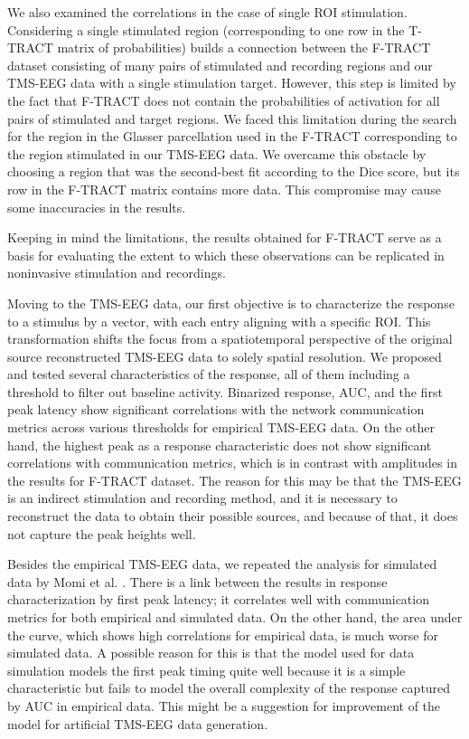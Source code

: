 We also examined the correlations in the case of single ROI stimulation. Considering a single stimulated region (corresponding to one row in the T-TRACT matrix of probabilities) builds a connection between the F-TRACT dataset consisting of many pairs of stimulated and recording regions and our TMS-EEG data with a single stimulation target. However, this step is limited by the fact that F-TRACT does not contain the probabilities of activation for all pairs of stimulated and target regions. We faced this limitation during the search for the region in the Glasser parcellation used in the F-TRACT corresponding to the region stimulated in our TMS-EEG data. We overcame this obstacle by choosing a region that was the second-best fit according to the Dice score, but its row in the F-TRACT matrix contains more data. This compromise may cause some inaccuracies in the results.

Keeping in mind the limitations, the results obtained for F-TRACT serve as a basis for evaluating the extent to which these observations can be replicated in noninvasive stimulation and recordings. 

Moving to the TMS-EEG data, our first objective is to characterize the response to a stimulus by a vector, with each entry aligning with a specific ROI. This transformation shifts the focus from a spatiotemporal perspective of the original source reconstructed TMS-EEG data to solely spatial resolution. We proposed and tested several characteristics of the response, all of them including a threshold to filter out baseline activity. Binarized response, AUC, and the first peak latency show significant correlations with the network communication metrics across various thresholds for empirical TMS-EEG data. On the other hand, the highest peak as a response characteristic does not show significant correlations with communication metrics, which is in contrast with amplitudes in the results for F-TRACT dataset. The reason for this may be that the TMS-EEG is an indirect stimulation and recording method, and it is necessary to reconstruct the data to obtain their possible sources, and because of that, it does not capture the peak heights well.

Besides the empirical TMS-EEG data, we repeated the analysis for simulated data by Momi et al. \cite{momi_tms-evoked_2023}. There is a link between the results in response characterization by first peak latency; it correlates well with communication metrics for both empirical and simulated data. On the other hand, the area under the curve, which shows high correlations for empirical data, is much worse for simulated data. A possible reason for this is that the model used for data simulation models the first peak timing quite well because it is a simple characteristic but fails to model the overall complexity of the response captured by AUC in empirical data. This might be a suggestion for improvement of the model for artificial TMS-EEG data generation.

